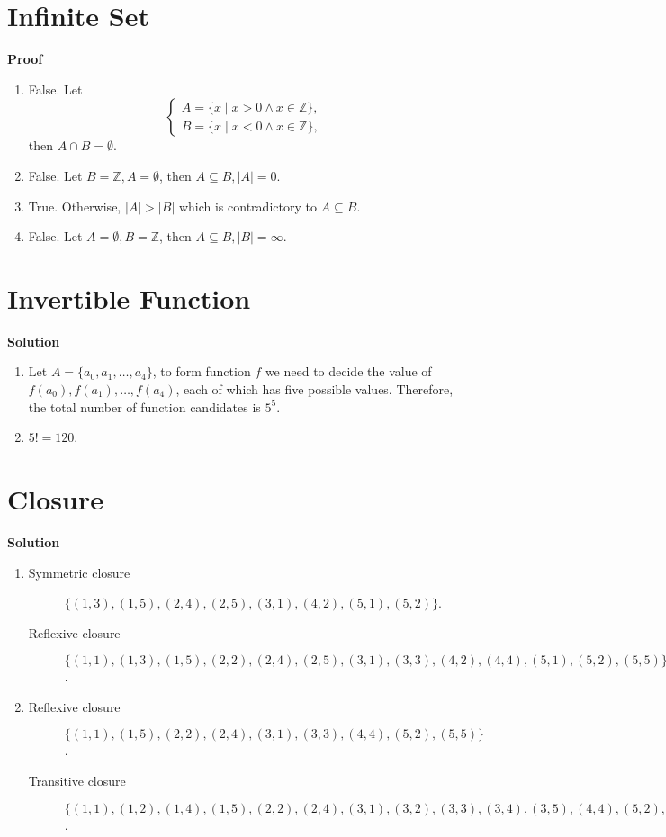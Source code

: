 \documentclass{../../cls/sig-alternate-05-2015}
\begin{document}
\section{Infinite Set}
\textbf{Proof}\begin{enumerate}[label=(\alph*)]
    \item False. Let \begin{equation}
        \begin{cases}
        A = \{x \mid x > 0 \land x \in \mathbb{Z}\},\\
        B = \{x \mid x < 0 \land x \in \mathbb{Z}\},
        \end{cases}
    \end{equation} then $A \cap B = \emptyset$.
    \item False. Let $B = \mathbb{Z}, A = \emptyset$, then $A \subseteq B, \left|A\right| = 0$.
    \item True. Otherwise, $\left|A\right| > \left|B\right|$ which is contradictory to $A \subseteq B$.
    \item False. Let $A = \emptyset, B = \mathbb{Z}$, then $A \subseteq B, \left|B\right| = \infty$.
\end{enumerate}

\section{Invertible Function}
\textbf{Solution}\begin{enumerate}[label=(\alph*)]
    \item Let $A = \{a_0, a_1, \ldots, a_4\}$, to form function $f$ we need to decide the value of $f(a_0), f(a_1), \ldots, f(a_4)$, each of which has five possible values. Therefore, the total number of function candidates is $5^5$.
    \item $5! = 120$.
\end{enumerate}

\section{Closure}
\textbf{Solution}\begin{enumerate}[label=(\alph*)]
    \item \begin{description}
        \item[Symmetric closure] $\{(1, 3), (1, 5), (2, 4), (2, 5), (3, 1), (4, 2), (5, 1), (5, 2)\}$.
        \item[Reflexive closure] $\{(1, 1), (1, 3), (1, 5), (2, 2), (2, 4), (2, 5), (3, 1), (3, 3), (4, 2), (4, 4), (5, 1), (5, 2), (5, 5)\}$.
    \end{description}
    \item \begin{description}
        \item[Reflexive closure] $\{(1, 1), (1, 5), (2, 2), (2, 4), (3, 1), (3, 3), (4, 4), (5, 2), (5, 5)\}$.
        \item[Transitive closure] $\{(1, 1), (1, 2), (1, 4), (1, 5), (2, 2), (2, 4), (3, 1), (3, 2), (3, 3), (3, 4), (3, 5), (4, 4), (5, 2), (5, 4), (5, 5)\}$.
    \end{description}
\end{enumerate}
\end{document}
